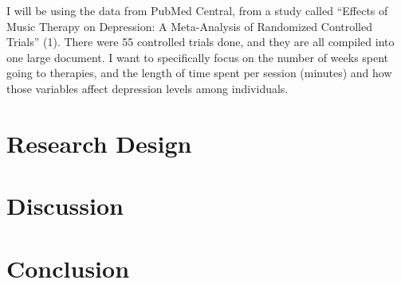\documentclass[12pt]{article}
\begin{document}
 I will be using the data from PubMed Central, from a study called “Effects of Music Therapy on Depression: A Meta-Analysis of Randomized Controlled Trials” (1). There were 55 controlled trials done, and they are all compiled into one large document. I want to specifically focus on the number of weeks spent going to therapies, and the length of time spent per session (minutes) and how those variables affect depression levels among individuals.


 \section{Research Design}
 \label{sec:research}

 

 \section{Discussion}
 \label{sec:disc}


 \section{Conclusion}
 \label{sec:con}
 

 
 
\end{document}
